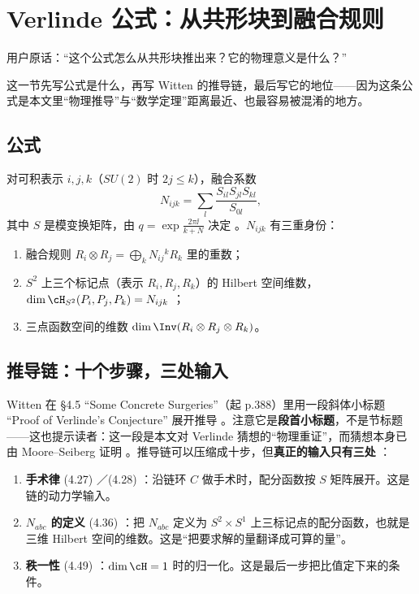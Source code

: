 \section{Verlinde 公式：从共形块到融合规则}
\label{sec:verlinde}

用户原话：“这个公式怎么从共形块推出来？它的物理意义是什么？”

这一节先写公式是什么，再写 Witten 的推导链，最后写它的地位——因为这条公式是本文里“物理推导”与“数学定理”距离最近、也最容易被混淆的地方。

\subsection{公式}

对可积表示 $i,j,k$（$SU(2)$ 时 $2j\le k$），融合系数
\begin{equation}
N_{ijk}=\sum_l \frac{S_{il}S_{jl}S_{kl}}{S_{0l}} ,
\label{eq:verlinde}
\end{equation}
其中 $S$ 是模变换矩阵，由 $q=\exp\frac{2\pi\ii}{k+N}$ 决定 。$N_{ijk}$ 有三重身份：
\begin{enumerate}[leftmargin=2em]
\item 融合规则 $R_i\otimes R_j=\bigoplus_k N_{ij}{}^k R_k$ 里的重数；
\item $S^2$ 上三个标记点（表示 $R_i,R_j,R_k$）的 Hilbert 空间维数，$\dim\cH_{S^2}(P_i,P_j,P_k)=N_{ijk}$ ；
\item 三点函数空间的维数 $\dim\Inv(R_i\otimes R_j\otimes R_k)$。
\end{enumerate}

\subsection{推导链：十个步骤，三处输入}

Witten 在 §4.5 “Some Concrete Surgeries”（起 p.388）里用一段斜体小标题 “Proof of Verlinde's Conjecture” 展开推导 。注意它是\textbf{段首小标题}，不是节标题——这也提示读者：这一段是本文对 Verlinde 猜想的“物理重证”，而猜想本身已由 Moore--Seiberg 证明 。推导链可以压缩成十步，但\textbf{真正的输入只有三处} \ours：

\begin{enumerate}[leftmargin=2em]
\item \textbf{手术律} (4.27) ／(4.28) ：沿链环 $C$ 做手术时，配分函数按 $S$ 矩阵展开。这是链的动力学输入。
\item \textbf{$N_{abc}$ 的定义} (4.36) ：把 $N_{abc}$ 定义为 $S^2\times S^1$ 上三标记点的配分函数，也就是三维 Hilbert 空间的维数。这是“把要求解的量翻译成可算的量”。
\item \textbf{秩一性} (4.49) ：$\dim\cH=1$ 时的归一化。这是最后一步把比值定下来的条件。
\end{enumerate}

